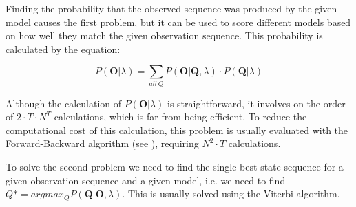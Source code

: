 Finding the probability that the observed sequence was produced by the given model causes the first problem, but it can be used to score different models based on how well they match the given observation sequence. This probability is calculated by the equation:

\begin{equation}
P(\mathbf{O}|\lambda) = \sum_{all \ Q} P(\mathbf{O}|\mathbf{Q},\lambda) \cdot P(\mathbf{Q}|\lambda)
\end{equation}

Although the calculation of $P(\mathbf{O}|\lambda)$ is straightforward, it involves on the order of $2 \cdot T \cdot N^{T}$ calculations, which is far from being efficient.
%
To reduce the computational cost of this calculation, this problem is usually evaluated with the Forward-Backward algorithm (see \cite{rabiner89}), requiring $N^{2} \cdot T $ calculations.

To solve the second problem we need to find the single best state sequence for a given observation sequence and a given model, i.e. we need to find $Q* = arg max_{Q} P(\mathbf{Q}|\mathbf{O},\lambda)$. 
%
This is usually solved using the Viterbi-algorithm.

